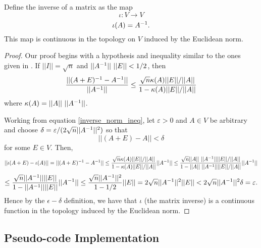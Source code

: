 \documentclass[letterpaper,titlepage]{article}
\begin{document}
\begin{thm}
    Define the inverse of a matrix as the map
    $$\iota:V \to V$$
    $$\iota(A) = A^{-1}.$$
    This map is continuous in the topology on $V$ induced by the Euclidean norm.
\end{thm}
\begin{proof}
    Our proof begins with a hypothesis and inequality similar to the ones given in \cite{Stewart}. If $||I||=\sqrt{n}$ and $||A^{-1}||\ ||E||<1/2$, then
    \begin{equation} \label{inverse_norm_ineq}
        \frac{||(A+E)^{-1}-A^{-1}||}{||A^{-1}||}\leq\frac{\sqrt{n}\kappa(A)||E||/||A||}{1-\kappa(A)||E||/||A||}   
    \end{equation} 
    where $\kappa(A) = ||A||\ ||A\inv||$.


    Working from equation \ref{inverse_norm_ineq}, let $\varepsilon>0$ and $A \in V$ be arbitrary and choose $\delta=\varepsilon/(2\sqrt{n}||A^{-1}||^2)$ so that $$||(A+E)-A|| < \delta$$ for some $E \in V$. Then,
    $$||\iota(A+E)-\iota(A)||=||(A+E)\inv-A\inv||\leq\frac{\sqrt{n}\kappa(A)||E||/||A||}{1-\kappa(A)||E||/||A||}||A\inv||\leq\frac{\sqrt{n}||A||\ ||A\inv||||E||/||A||}{1-||A||\ ||A\inv||||E||/||A||}||A\inv||$$
    $$\leq \frac{\sqrt{n}||A^{-1}||||E||}{1-||A^{-1}||||E||}||A^{-1}||\leq 
    \frac{\sqrt{n}||A^{-1}||^2}{1-1/2}||E||=2\sqrt{n}||A^{-1}||^2||E||< 2\sqrt{n}||A^{-1}||^2\delta = \varepsilon.$$
    Hence by the $\epsilon-\delta$ definition, we have that $\iota$ (the matrix inverse) is a continuous function in the topology induced by the Euclidean norm.
\end{proof}

\subsection{Pseudo-code Implementation}

\end{document}
